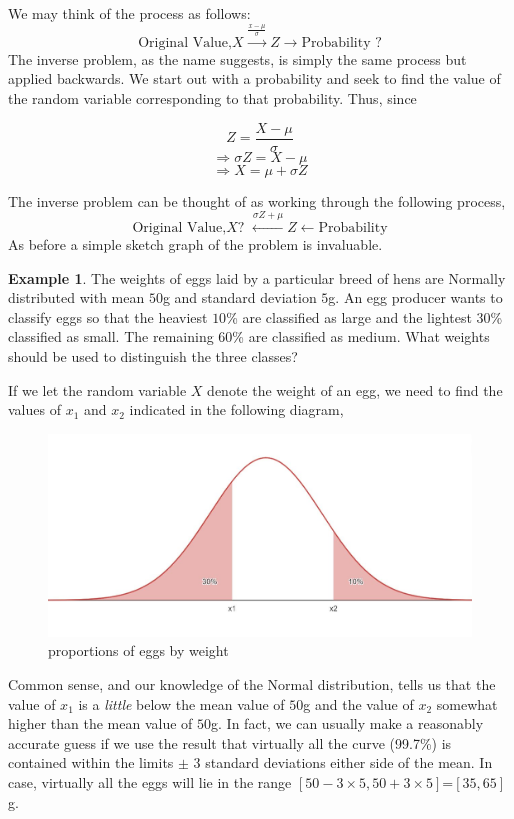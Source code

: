 \documentclass[
]{book}
\theoremstyle{definition}
\theoremstyle{definition}
\newtheorem{example}{Example}[chapter]
\theoremstyle{definition}
\theoremstyle{definition}
\theoremstyle{remark}
\begin{document}
We may think of the process as follows:
\[ \mbox{Original Value,
}X\stackrel{\frac{x-\mu}{\sigma}}{\longrightarrow} Z
\longrightarrow \mbox{Probability ?}
\]
The inverse problem, as the name suggests, is simply the same
process but applied backwards. We start out with a probability and seek to find
the value of the random variable corresponding to that probability. Thus, since

\[Z  =  \frac{X-\mu}{\sigma} \]
\[\Rightarrow \sigma Z = X-\mu \]
\[\Rightarrow X  =  \mu+\sigma Z\]

The inverse problem can be thought of as working through
the following process,
\[ \mbox{Original Value,
}X\mbox{? }\stackrel{\sigma Z+\mu}{\longleftarrow} Z
\longleftarrow \mbox{Probability}
\]
As before a simple sketch graph of the problem is invaluable.

\begin{example}
The weights of eggs laid by a particular breed of hens are
Normally distributed with mean \(50\)g and standard deviation \(5\)g. An
egg producer wants to classify eggs so that the heaviest \(10\)\% are
classified as large and the lightest \(30\)\% classified as small. The
remaining \(60\)\% are classified as medium. What weights should be
used to distinguish the three classes?
\end{example}

If we let the random variable \(X\) denote the weight of an egg,
we need to find the values of \(x_1\) and \(x_2\) indicated in the
following diagram,

\begin{figure}

{\centering \includegraphics[width=0.75\linewidth]{./figures/eggs} 

}

\caption{proportions of eggs by weight}\label{fig:eggs}
\end{figure}

Common sense, and our knowledge of the Normal distribution, tells us that the value of \(x_1\) is a \emph{little} below the mean value of \(50\)g and the value of \(x_2\) somewhat higher than the mean value of \(50\)g. In fact, we can usually make a reasonably accurate guess if we use the result that virtually all the curve (99.7\%) is contained within the limits \(\pm\) 3 standard deviations either side of the mean. In case, virtually all the eggs will lie in the range \([50-3\times 5,50+3\times5]\)=\([35,65]\)g.
\end{document}
